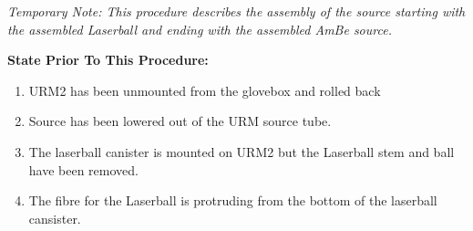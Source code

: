 {\em Temporary Note:  This procedure describes the assembly of the
  source starting with the assembled Laserball and ending with the
  assembled AmBe source.}






\noindent
{\bf State Prior To This Procedure:}
\begin{enumerate}
\item URM2 has been unmounted from the glovebox and rolled back
\item Source has been lowered out of the URM source tube.
\item The laserball canister is mounted on URM2 but the
  Laserball stem and ball have been removed.
\item The fibre for the Laserball is protruding from the bottom
  of the laserball cansister.
\end{enumerate}




